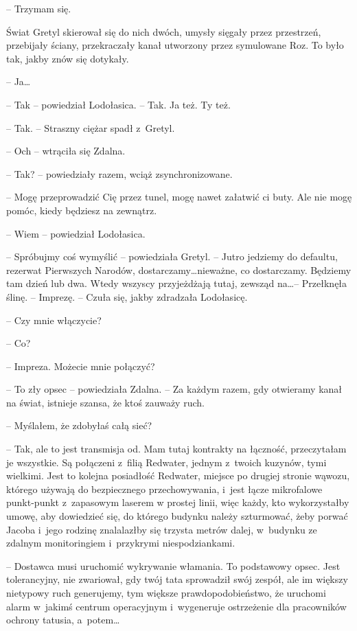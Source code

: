 \documentclass[oneside,polish,11pt,sfheadings]{mwbk}
\begin{document}
-- Trzymam się.

Świat Gretyl skierował się do nich dwóch, umysły sięgały przez
przestrzeń, przebijały ściany, przekraczały kanał utworzony przez
symulowane Roz. To było tak, jakby znów się dotykały. 

-- Ja\ldots 

-- Tak -- powiedział Lodołasica. -- Tak. Ja też. Ty też.

-- Tak. -- Straszny ciężar spadł z~Gretyl.

-- Och -- wtrąciła się Zdalna.

-- Tak? -- powiedziały razem, wciąż zsynchronizowane.

-- Mogę przeprowadzić Cię przez tunel, mogę nawet załatwić ci buty. Ale
nie mogę pomóc, kiedy będziesz na zewnątrz.

-- Wiem -- powiedział Lodołasica.

-- Spróbujmy coś wymyślić -- powiedziała Gretyl. -- Jutro jedziemy do
defaultu, rezerwat Pierwszych Narodów, dostarczamy\ldots  nieważne, co
dostarczamy. Będziemy tam dzień lub dwa. Wtedy wszyscy przyjeżdżają
tutaj, zewsząd na\ldots  -- Przełknęła ślinę. -- Imprezę. -- Czuła się, jakby
zdradzała Lodołasicę.

-- Czy mnie włączycie?

-- Co?

-- Impreza. Możecie mnie połączyć?

-- To zły opsec -- powiedziała Zdalna. -- Za każdym razem, gdy otwieramy
kanał na świat, istnieje szansa, że ktoś zauważy ruch.

-- Myślałem, że zdobyłaś całą sieć?

-- Tak, ale to jest transmisja od. Mam tutaj kontrakty na łączność,
przeczytałam je wszystkie. Są połączeni z~filią Redwater, jednym z~twoich kuzynów, tymi wielkimi. Jest to kolejna posiadłość Redwater,
miejsce po drugiej stronie wąwozu, którego używają do bezpiecznego
przechowywania, i~jest łącze mikrofalowe punkt-punkt z~zapasowym laserem
w prostej linii, więc każdy, kto wykorzystałby umowę, aby dowiedzieć
się, do którego budynku należy szturmować, żeby porwać Jacoba i~jego
rodzinę znalalazłby się trzysta metrów dalej, w~budynku ze zdalnym
monitoringiem i~przykrymi niespodziankami.

-- Dostawca musi uruchomić wykrywanie włamania. To podstawowy opsec. Jest
tolerancyjny, nie zwariował, gdy twój tata sprowadził swój zespół, ale
im większy nietypowy ruch generujemy, tym większe prawdopodobieństwo, że
uruchomi alarm w~jakimś centrum operacyjnym i~wygeneruje ostrzeżenie dla
pracowników ochrony tatusia, a~potem\ldots 
\end{document}
